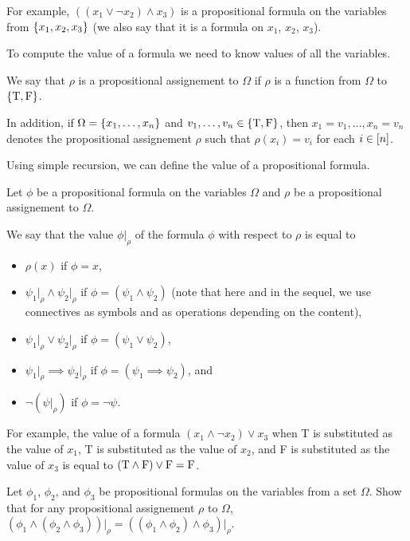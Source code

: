 For example, $((x_1 \lor \lnot x_2) \land x_3)$ is a propositional formula on
the variables from $\set{x_1, x_2, x_3}$ (we also say that it is a formula on
$x_1$, $x_2$, $x_3$).

To compute the value of a formula we need to know values of all the variables.
\begin{definition}
  We say that $\rho$ is a propositional assignement to $\Omega$ if $\rho$
  is a function from $\Omega$ to $\set{\ltrue, \lfalse}$.

  In addition, if $\Omega = \set{x_1, \dots, x_n}$ and
  $v_1, \dots, v_n \in \set{\ltrue, \lfalse}$, then
  $x_1 = v_1, \dots, x_n = v_n$ denotes the propositional assignement
  $\rho$ such that $\rho(x_i) = v_i$ for each $i \in [{n}]$.
\end{definition}

Using simple recursion, we can define the value of a propositional formula.
\begin{definition}
  Let $\phi$ be a propositional formula on the variables $\Omega$ and
  $\rho$ be a propositional assignement to $\Omega$.

  We say that the value $\phi\big\rvert_\rho$ of the
  formula $\phi$ with respect to $\rho$ is equal to
  \begin{itemize}
    \item $\rho(x)$ if $\phi = x$,
    \item $\psi_1\big\rvert_\rho \land
      \psi_2\big\rvert_\rho$ if
      $\phi = (\psi_1 \land \psi_2)$ (note that here and in the
      sequel, we use connectives as symbols and as operations depending on
      the content),
    \item $\psi_1\big\rvert_\rho \lor
      \psi_2\big\rvert_\rho$ if
      $\phi = (\psi_1 \lor \psi_2)$,
    \item $\psi_1\big\rvert_\rho \implies
      \psi_2\big\rvert_\rho$ if
      $\phi = (\psi_1 \implies \psi_2)$, and
    \item $\lnot\left(\psi\big\rvert_\rho\right)$
      if $\phi = \lnot \psi$.
  \end{itemize}
\end{definition}

For example, the value of a formula $(x_1 \land \lnot x_2) \lor x_3$ when T is
substituted as the value of $x_1$, T is substituted as the value of $x_2$,
and F is substituted as the value of $x_3$ is equal to
$(\text{T} \land \text{F}) \lor \text{F} = \text{F}$.

\begin{exercise}
  Let $\phi_1$, $\phi_2$, and $\phi_3$ be propositional formulas on the
  variables from a set $\Omega$. Show that for any propositional assignement
  $\rho$ to $\Omega$,
  $(\phi_1 \land (\phi_2 \land \phi_3))\big\rvert_\rho =
   ((\phi_1 \land \phi_2) \land \phi_3)\big\rvert_\rho$.
\end{exercise}

